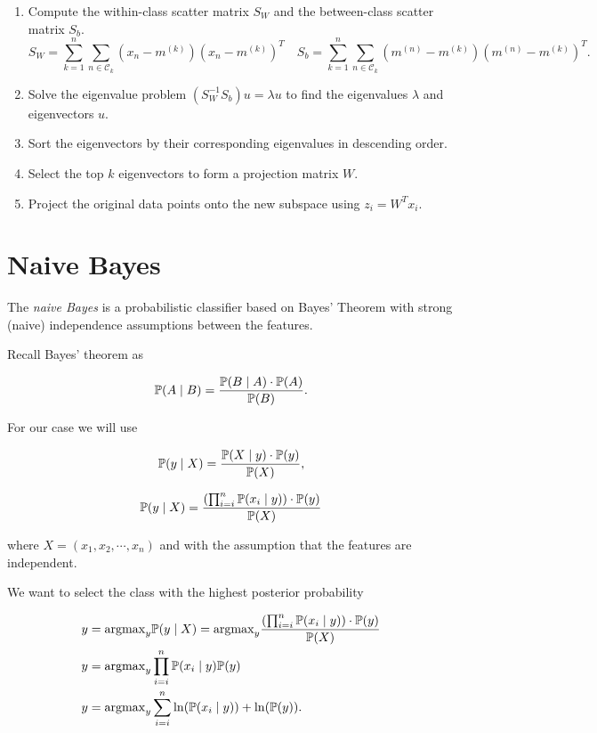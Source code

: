 \begin{enumerate}

	\item Compute the within-class scatter matrix \(S_W\) and the between-class scatter matrix \(S_b\).
	\[
		S_W =  \sum_{k = 1}^{n} \sum_{n \in \mathcal{C}_k} (x_n - m^{(k)})(x_n - m^{(k)})^T \quad S_b = \sum_{k = 1}^{n} \sum_{n \in \mathcal{C}_k} (m^{(n)} - m^{(k)})(m^{(n)} - m^{(k)})^T.
	\]
	
	\item Solve the eigenvalue problem \((S_W^{-1} S_b) u = \lambda u\) to find the eigenvalues \(\lambda\) and eigenvectors \(u\).

	\item Sort the eigenvectors by their corresponding eigenvalues in descending order.

	\item Select the top \(k\) eigenvectors to form a projection matrix \(W\).

	\item Project the original data points onto the new subspace using \(z_i = W^T x_i\).

\end{enumerate}

\section{Naive Bayes}

The \emph{naive Bayes} is a probabilistic classifier based on Bayes' Theorem with strong (naive)
independence assumptions between the features.

Recall Bayes' theorem as

\[
	\mathbb{P}(A \mid B) = \frac{\mathbb{P}(B \mid A) \cdot \mathbb{P}(A)}{\mathbb{P}(B)}.
\]

For our case we will use

\[
	\mathbb{P}(y \mid X) = \frac{\mathbb{P}(X \mid y) \cdot \mathbb{P}(y)}{\mathbb{P}(X)},
\]

\[
	\mathbb{P}(y \mid X) = \frac{\left(\prod_{i = i }^{n} \mathbb{P}(x_i \mid y) \right) \cdot \mathbb{P}(y)}{\mathbb{P}(X)}
\]

where \(X = (x_1, x_2, \cdots, x_n)\) and with the assumption that the features are independent.

We want to select the class with the highest posterior probability

\begin{align*}
	y & = \mathrm{argmax}_y  \mathbb{P}(y \mid X) = \mathrm{argmax}_y \frac{\left(\prod_{i = i }^{n} \mathbb{P}(x_i \mid y) \right) \cdot \mathbb{P}(y)}{\mathbb{P}(X)} \\
	y & = \mathrm{argmax}_y \prod_{i = i }^{n} \mathbb{P}(x_i \mid y) \mathbb{P}(y)                                                                   \\
	y & = \mathrm{argmax}_y \sum_{i = i }^{n} \ln(\mathbb{P}(x_i \mid y)) + \ln(\mathbb{P}(y)).
\end{align*}

